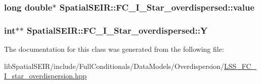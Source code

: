 \hypertarget{classSpatialSEIR_1_1FC__I__Star__overdispersed_abc747c69c47f8b6019e27c64c0ddeb8c}{
\subsubsection[{value}]{\setlength{\rightskip}{0pt plus 5cm}long double$\ast$ Spatial\-S\-E\-I\-R\-::\-F\-C\-\_\-\-I\-\_\-\-Star\-\_\-overdispersed\-::value}}\label{classSpatialSEIR_1_1FC__I__Star__overdispersed_abc747c69c47f8b6019e27c64c0ddeb8c}
\hypertarget{classSpatialSEIR_1_1FC__I__Star__overdispersed_ade65d87298fcc402c6ac460aef295180}{
\subsubsection[{Y}]{\setlength{\rightskip}{0pt plus 5cm}int$\ast$$\ast$ Spatial\-S\-E\-I\-R\-::\-F\-C\-\_\-\-I\-\_\-\-Star\-\_\-overdispersed\-::\-Y}}\label{classSpatialSEIR_1_1FC__I__Star__overdispersed_ade65d87298fcc402c6ac460aef295180}


The documentation for this class was generated from the following file\-:\begin{DoxyCompactItemize}
\item 
lib\-Spatial\-S\-E\-I\-R/include/\-Full\-Conditionals/\-Data\-Models/\-Overdispersion/\hyperlink{LSS__FC__I__star__overdispersion_8hpp}{L\-S\-S\-\_\-\-F\-C\-\_\-\-I\-\_\-star\-\_\-overdispersion.\-hpp}\end{DoxyCompactItemize}
